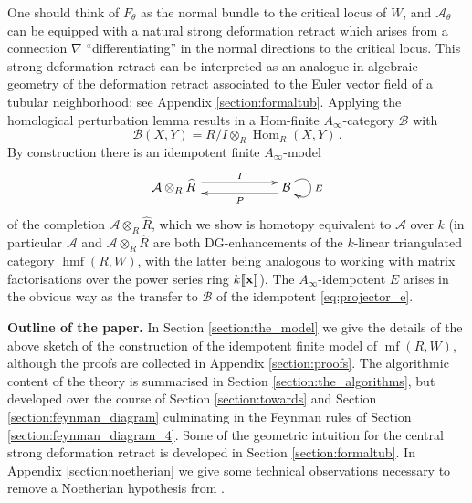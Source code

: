 \documentclass[english,letter paper,12pt,leqno]{article}
\theoremstyle{example}
\numberwithin{equation}{section}
\def\AA{\mathcal{A}}
\def\BB{\mathcal{B}}
\def\Hom{\operatorname{Hom}}
\DeclareMathOperator{\hmf}{hmf}
\begin{document}
One should think of $F_\theta$ as the normal bundle to the critical locus of $W$, and $\AA_\theta$ can be equipped with a natural strong deformation retract which arises from a connection $\nabla$ ``differentiating'' in the normal directions to the critical locus. This strong deformation retract can be interpreted as an analogue in algebraic geometry of the deformation retract associated to the Euler vector field of a tubular neighborhood; see Appendix \ref{section:formaltub}. Applying the homological perturbation lemma results in a Hom-finite $A_\infty$-category $\BB$ with
\[
\BB(X,Y) = R/I \otimes_R \Hom_R(X,Y)\,.
\]
By construction there is an idempotent finite $A_\infty$-model
\[
\xymatrix@C+3pc{
\AA \otimes_R \widehat{R}\, \ar@<1ex>[r]^-I & \mathcal{B} \ar@(ur,dr)^E \ar@<1ex>[l]^-P
}
\]
of the completion $\AA \otimes_R \widehat{R}$, which we show is homotopy equivalent to $\AA$ over $k$ (in particular $\AA$ and $\AA \otimes_R \widehat{R}$ are both DG-enhancements of the $k$-linear triangulated category $\hmf(R,W)$, with the latter being analogous to working with matrix factorisations over the power series ring $k\llbracket \bold{x} \rrbracket$). The $A_\infty$-idempotent $E$ arises in the obvious way as the transfer to $\BB$ of the idempotent \eqref{eq:projector_e}.

\vspace{0.3cm}

\textbf{Outline of the paper.} In Section \ref{section:the_model} we give the details of the above sketch of the construction of the idempotent finite model of $\operatorname{mf}(R,W)$, although the proofs are collected in Appendix \ref{section:proofs}. The algorithmic content of the theory is summarised in Section \ref{section:the_algorithms}, but developed over the course of Section \ref{section:towards} and Section \ref{section:feynman_diagram} culminating in the Feynman rules of Section \ref{section:feynman_diagram_4}. Some of the geometric intuition for the central strong deformation retract is developed in Section \ref{section:formaltub}. In Appendix \ref{section:noetherian} we give some technical observations necessary to remove a Noetherian hypothesis from \cite{cut}.

\vspace{0.3cm}
\end{document}
